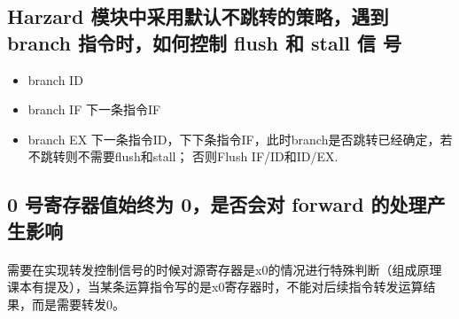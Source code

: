 \documentclass{article}
\begin{document}
    \subsection{Harzard 模块中采用默认不跳转的策略，遇到 branch 指令时，如何控制 flush 和 stall 信
    号}
    \begin{itemize}
        \item branch ID
        \item branch IF 下一条指令IF
        \item branch EX 下一条指令ID，下下条指令IF，此时branch是否跳转已经确定，若不跳转则不需要flush和stall；
        否则Flush IF/ID和ID/EX.
    \end{itemize}
    \subsection{0 号寄存器值始终为 0，是否会对 forward 的处理产生影响}
    \paragraph{}
    需要在实现转发控制信号的时候对源寄存器是x0的情况进行特殊判断（组成原理课本有提及），当某条运算指令写的是x0寄存器时，不能对后续指令转发运算结果，而是需要转发0。
\end{document}
